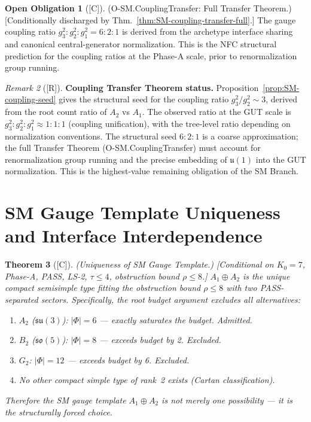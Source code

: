 \documentclass[12pt,oneside]{amsbook}
\theoremstyle{plain}
\newtheorem{theorem}{Theorem}[section]
\theoremstyle{definition}
\newtheorem{obligation}[theorem]{Open Obligation}
\theoremstyle{remark}
\newtheorem{remark}[theorem]{Remark}
\newcommand{\status}[1]{\textup{[#1]}}
\begin{document}
\begin{obligation}[\status{C}]\label{ob:SM-coupling-transfer-full}
\textup{(O-SM.CouplingTransfer: Full Transfer Theorem.)}
\textup{[Conditionally discharged by
Thm.~\ref{thm:SM-coupling-transfer-full}.]}
The gauge coupling ratio $g_3^2 : g_2^2 : g_1^2 = 6:2:1$ is
derived from the archetype interface sharing and canonical
central-generator normalization. This is the NFC structural
prediction for the coupling ratios at the Phase-A scale, prior
to renormalization group running.
\end{obligation}

\begin{remark}[\status{R}]
\textbf{Coupling Transfer Theorem status.}
Proposition~\ref{prop:SM-coupling-seed} gives the structural seed
for the coupling ratio $g_3^2/g_2^2 \sim 3$, derived from the
root count ratio of $A_2$ vs $A_1$. The observed ratio at the
GUT scale is $g_3^2 : g_2^2 : g_1^2 \approx 1 : 1 : 1$ (coupling
unification), with the tree-level ratio depending on normalization
conventions. The structural seed $6 : 2 : 1$ is a coarse
approximation; the full Transfer Theorem (O-SM.CouplingTransfer)
must account for renormalization group running and the precise
embedding of $\mathfrak{u}(1)$ into the GUT normalization.
This is the highest-value remaining obligation of the SM Branch.
\end{remark}

\section{SM Gauge Template Uniqueness and Interface Interdependence}
\label{sec:sm-uniqueness}

\begin{theorem}[\status{C}]\label{thm:gauge-template-unique}
\textup{(Uniqueness of SM Gauge Template.)}
\textup{[Conditional on $K_0=7$, Phase-A, PASS, LS-2, $\tau \leq 4$,
obstruction bound $\rho \leq 8$.]}
$A_1 \oplus A_2$ is the \emph{unique} compact semisimple type fitting
the obstruction bound $\rho \leq 8$ with two PASS-separated sectors.
Specifically, the root budget argument excludes all alternatives:
\begin{enumerate}[label=\textup{(\arabic*)}]
 \item $A_2$ ($\mathfrak{su}(3)$): $|\Phi| = 6$ --- exactly saturates
 the budget. \emph{Admitted.}
 \item $B_2$ ($\mathfrak{so}(5)$): $|\Phi| = 8$ --- exceeds budget by
 2. \emph{Excluded.}
 \item $G_2$: $|\Phi| = 12$ --- exceeds budget by 6. \emph{Excluded.}
 \item No other compact simple type of rank~2 exists (Cartan
 classification).
\end{enumerate}
Therefore the SM gauge template $A_1 \oplus A_2$ is not merely one
possibility --- it is the \emph{structurally forced} choice.
\end{theorem}
\end{document}
